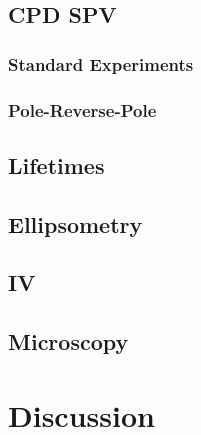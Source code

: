 \subsection{CPD SPV}
\subsubsection{Standard Experiments}
\subsubsection{Pole-Reverse-Pole}
\subsection{Lifetimes}
\subsection{Ellipsometry}
\subsection{\ir{}}
\subsection{IV}
\subsection{Microscopy}
\subsection{\dls{}}


\section{Discussion}